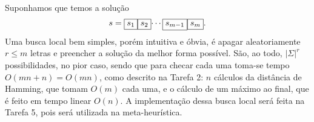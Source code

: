 Suponhamos que temos a solução
\[s = \text{\fbox{$s_1$}\fbox{$s_2$}$\cdots$\fbox{$s_{m-1}$}\fbox{$s_m$}}.\]
Uma busca local bem simples, porém intuitiva e óbvia, é apagar aleatoriamente $r \le m$ letras e preencher a solução da melhor forma possível. São, ao todo, $|\Sigma|^r$ possibilidades, no pior caso, sendo que para checar cada uma toma-se tempo $O(mn+n) = O(mn)$, como descrito na Tarefa 2: $n$ cálculos da distância de Hamming, que tomam $O(m)$ cada uma, e o cálculo de um máximo ao final, que é feito em tempo linear $O(n)$.
A implementação dessa busca local será feita na Tarefa 5, pois será utilizada na meta-heurística.

